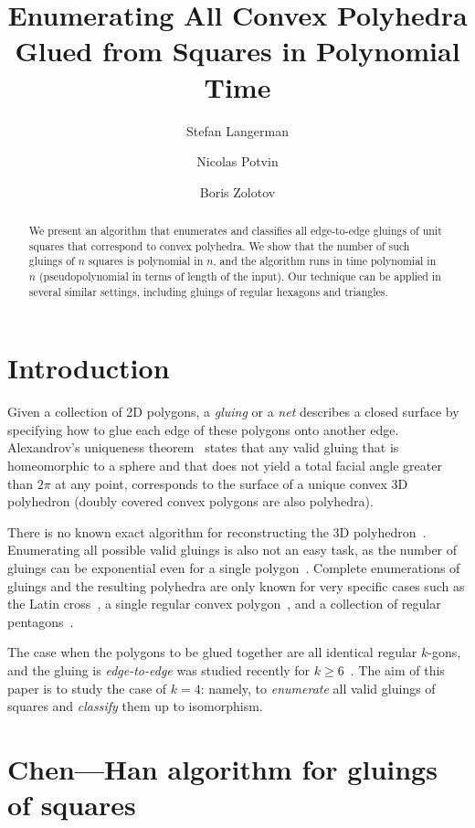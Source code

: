 \documentclass[a4paper,USenglish,cleveref, autoref, thm-restate]{socg-lipics-v2019}
\title{Enumerating All Convex Polyhedra Glued from Squares in Polynomial Time}
\author{Stefan Langerman}{Faculté des Sciences, Université Libre de Bruxelles}{stefan.langerman@ulb.ac.be}{ }{is Directeur de recherches du F.R.S.-FNRS}
\author{Nicolas Potvin}{Faculté des Sciences, Université Libre de Bruxelles}{potvinnicolas2@gmail.com}{ }{}
\author{Boris Zolotov}{Department of Mathematics and Computer Sciences, St. Petersburg State University}{boris.a.zolotov@yandex.com}{ }{is supported in part by the Foundation for the Advancement of Theoretical Physics and Mathematics ``BASIS'' and in part by ``Native towns'', a social investment program of PJSC ``Gazprom Neft''.}
\begin{document}
\maketitle

\begin{abstract}We present an algorithm that enumerates and classifies all edge-to-edge gluings of unit squares that correspond to convex polyhedra. We show that the number of such gluings of $n$ squares is polynomial in $n$, and the algorithm runs in time polynomial in $n$ (pseudopolynomial in terms of length of the input). Our technique can be applied in several similar settings, including gluings of regular hexagons and triangles.\end{abstract}

\section{Introduction}

Given a collection of 2D polygons, a \emph{gluing} or a \emph{net} describes a closed surface by specifying how to glue each edge of these polygons onto another edge. Alexandrov's uniqueness theorem~\cite{alex} states that any valid gluing that is homeomorphic to a sphere and that does not yield a total facial angle greater than $2\pi$ at any point, corresponds to the surface of a unique convex 3D polyhedron (doubly covered convex polygons are also polyhedra).

There is no known exact algorithm for reconstructing the 3D polyhedron~\cite{bannister2014galois,kpd09-approx}. Enumerating all possible valid gluings is also not an easy task, as the number of gluings can be exponential even for a single polygon~\cite{DDLO02}. Complete enumerations of gluings and the resulting polyhedra are only known for very specific cases such as the Latin cross~\cite{ddlop99}, a single regular convex polygon~\cite{DO07}, and a collection of regular pentagons~\cite{alz-penta}.

The case when the polygons to be glued together are all identical regular $k$-gons, and the gluing is \emph{edge-to-edge} was studied recently for $k \ge 6$~\cite{kl17-hex}. The aim of this paper is to study the case of $k=4$: namely, to {\it enumerate} all valid gluings of squares and {\it classify} them up to isomorphism.

\section{Chen—Han algorithm for gluings of squares}
\end{document}
